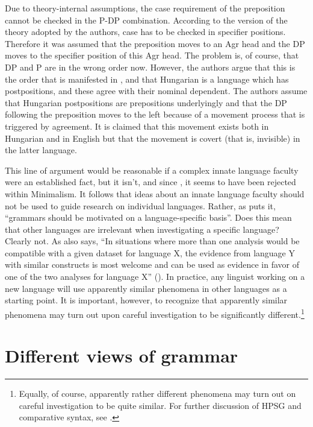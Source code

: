 \documentclass[output=paper
                ,modfonts
                ,nonflat
	        ,collection
	        ,collectionchapter
	        ,collectiontoclongg
 	        ,biblatex
                ,babelshorthands
                ,newtxmath
                ,draftmode
                ,colorlinks, citecolor=brown
]{./langsci/langscibook}
\begin{document}
Due to theory-internal assumptions, the case requirement of the preposition cannot be checked in the
P-DP combination. According to the version of the theory adopted by the authors, case has to be
checked in specifier positions. Therefore it was assumed that the preposition moves to an Agr head
and the DP moves to the specifier position of this Agr head. The problem is, of course, that DP and P
are in the wrong order now. However, the authors argue that this is the order that is manifested in
, and that Hungarian is a language which has postpositions, and these agree with
their nominal dependent. The authors assume that Hungarian postpositions are prepositions
underlyingly and that the DP following the preposition moves to the left because of a movement
process that is triggered by agreement. It is claimed that this movement exists both in Hungarian and in English but
that the movement is covert (that is, invisible) in the latter language.

This line of argument would be reasonable if a complex innate language
faculty were an established fact, but it isn't, and since \citet*{HCF2002a}, it seems to have been
rejected within Minimalism. It follows that ideas about an innate language faculty should not be
used to guide research on individual languages. Rather, as \citet[25]{MuellerCoreGram} puts it,
``grammars should be motivated on a language-specific basis''. Does this mean that other languages are
irrelevant when investigating a specific language? Clearly not. As 
also says, ``In situations where more than one analysis would be compatible with a given dataset
for language X, the evidence from language Y with similar constructs is most welcome and can be used
as evidence in favor of one of the two analyses for language X'' (\citeyear[43]{MuellerCoreGram}). In
practice, any linguist working on a new language will use apparently similar phenomena in other
languages as a starting point. It is important, however, to recognize that apparently similar
phenomena may turn out upon careful investigation to be significantly different.\footnote{%
  Equally, of course, apparently rather different phenomena may turn out on careful investigation to
  be quite similar. For further discussion of HPSG and comparative syntax, see .%
} 

\section{Different views of grammar}
\label{sec:min-views-grammar}
\end{document}

